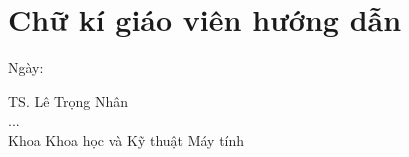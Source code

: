 \chapter*{Chữ kí giáo viên hướng dẫn}

\vspace{1cm}

\makebox[0.7\linewidth][l]{\hrulefill} Ngày: \makebox[0.2\linewidth][l]{\hrulefill}

    \begin{flushleft}
    TS. Lê Trọng Nhân\\
    ... \\
    Khoa Khoa học và Kỹ thuật Máy tính
    \end{flushleft}